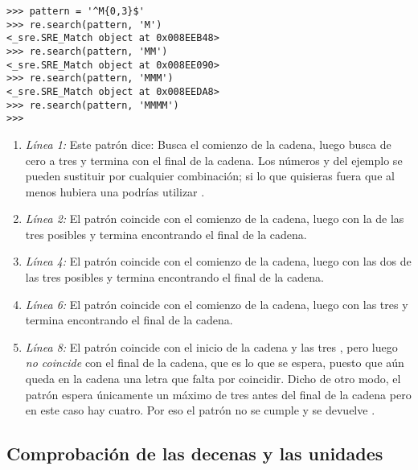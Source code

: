 \noindent\begin{minipage}{\textwidth}
\begin{lstlisting}[mathescape=False]
>>> pattern = '^M{0,3}$'
>>> re.search(pattern, 'M')
<_sre.SRE_Match object at 0x008EEB48>
>>> re.search(pattern, 'MM')
<_sre.SRE_Match object at 0x008EE090>
>>> re.search(pattern, 'MMM')
<_sre.SRE_Match object at 0x008EEDA8>
>>> re.search(pattern, 'MMMM')
>>> 
\end{lstlisting}
\end{minipage}

\begin{enumerate}

\item \emph{Línea 1:} Este patrón dice: Busca el comienzo de la cadena, luego busca de cero a tres  y termina con el final de la cadena. Los números  y  del ejemplo se pueden sustituir por cualquier combinación; si lo que quisieras fuera que al menos hubiera una  podrías utilizar .

\item \emph{Línea 2:} El patrón coincide con el comienzo de la cadena, luego con la  de las tres posibles y termina encontrando el final de la cadena.

\item \emph{Línea 4:} El patrón coincide con el comienzo de la cadena, luego con las dos  de las tres posibles y termina encontrando el final de la cadena.

\item \emph{Línea 6:} El patrón coincide con el comienzo de la cadena, luego con las tres  y termina encontrando el final de la cadena.

\item \emph{Línea 8:} El patrón coincide con el inicio de la cadena y las tres , pero luego \emph{no coincide} con el final de la cadena, que es lo que se espera, puesto que aún queda en la cadena una letra  que falta por coincidir. Dicho de otro modo, el patrón espera únicamente un máximo de tres  antes del final de la cadena pero en este caso hay cuatro. Por eso el patrón no se cumple y se devuelve .

\end{enumerate}



\subsection{Comprobación de las decenas y las unidades}

